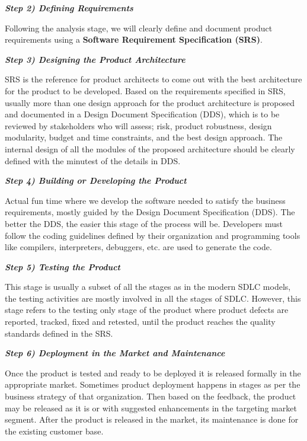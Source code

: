 \documentclass{article}
\begin{document}
{\vspace{0.3cm}

\textbf{\textit{Step 2) Defining Requirements}}

Following the analysis stage, we will clearly define and document product requirements using a \textbf{Software Requirement Specification (SRS)}. 

\vspace{0.3cm}

\textbf{\textit{Step 3) Designing the Product Architecture}}

SRS is the reference for product architects to come out with the best architecture for the product to be developed. Based on the requirements specified in SRS, usually more than one design approach for the product architecture is proposed and documented in a Design Document Specification (DDS), which is to be reviewed by stakeholders who will assess; risk, product robustness, design modularity, budget and time constraints, and the best design approach. The internal design of all the modules of the proposed architecture should be clearly defined with the minutest of the details in DDS.

\vspace{0.3cm}

\textbf{\textit{Step 4) Building or Developing the Product}}

Actual fun time where we develop the software needed to satisfy the business requirements, mostly guided by the Design Document Specification (DDS). The better the DDS, the easier this stage of the process will be. Developers must follow the coding guidelines defined by their organization and programming tools like compilers, interpreters, debuggers, etc. are used to generate the code.

\vspace{0.3cm}

\textbf{\textit{Step 5) Testing the Product}}

This stage is usually a subset of all the stages as in the modern SDLC models, the testing activities are mostly involved in all the stages of SDLC. However, this stage refers to the testing only stage of the product where product defects are reported, tracked, fixed and retested, until the product reaches the quality standards defined in the SRS.

\vspace{0.3cm}

\textbf{\textit{Step 6) Deployment in the Market and Maintenance}}

Once the product is tested and ready to be deployed it is released formally in the appropriate market. Sometimes product deployment happens in stages as per the business strategy of that organization. Then based on the feedback, the product may be released as it is or with suggested enhancements in the targeting market segment. After the product is released in the market, its maintenance is done for the existing customer base.

}
\end{document}
